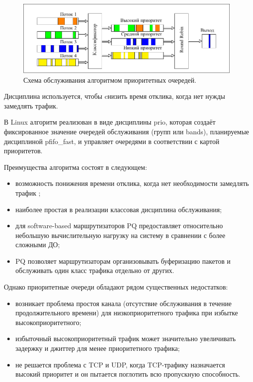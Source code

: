     \begin{figure}[ht!]
        \center
        \includegraphics[scale=1.3]{pdfimages/pq.pdf}
        \caption{Схема обслуживания алгоритмом приоритетных очередей.}
		\label{pic:pq}
    \end{figure}

    Дисциплина используется, чтобы cнизить время отклика, когда нет нужды замедлять трафик\cite{tcprio}. 

    В Linux алгоритм реализован в виде дисциплины prio, которая создаёт фиксированное
    значение очередей обслуживания (групп или bands), планируемые дисциплиной pfifo\_fast,
	и управляет очередями в соответствии с картой приоритетов.\cite{tcprio}



    Преимущества алгоритма состоят в следующем:
    \begin{itemize}
		\item возможность понижения времени отклика, когда нет необходимости замедлять трафик \cite{tcprio};
        \item наиболее простая в реализации классовая дисциплина обслуживания;
        \item для software-based маршрутизаторов PQ предоставляет относительно небольшую
             вычислительную нагрузку на систему в сравнении с более сложными ДО;
        \item PQ позволяет маршрутизаторам организовывать буферизацию пакетов и обслуживать
             один класс трафика отдельно от других. \cite{suppdiff}
    \end{itemize}

    Однако приоритетные очереди обладают рядом существенных недостатков:
    \begin{itemize}
        \item возникает проблема простоя канала (отсутствие обслуживания в течение продолжительного времени)
			  для низкоприоритетного трафика при избытке высокоприоритетного\cite{packethandling};
        \item избыточный высокоприоритетный трафик может значительно увеличивать
                задержку и джиттер для менее приоритетного трафика;
        \item не решается проблема с TCP и UDP, когда TCP-трафику назначается высокий приоритет и он
                пытается поглотить всю пропускную способность. \cite{suppdiff}
    \end{itemize}

